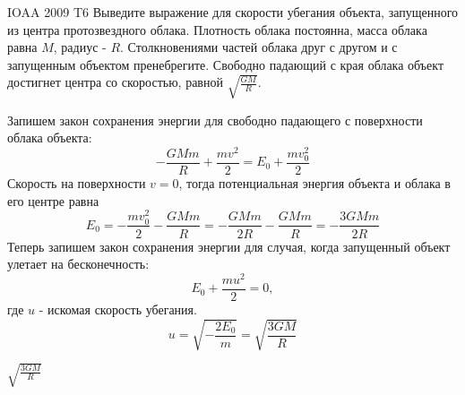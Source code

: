 \begin{problem}{IOAA 2009 T6} 
	Выведите выражение для скорости убегания объекта, запущенного из центра протозвездного облака. Плотность облака постоянна, масса облака равна $M$, радиус - $R$. Столкновениями частей облака друг с другом и с запущенным объектом пренебрегите. Свободно падающий с края облака объект достигнет центра со скоростью, равной $\sqrt{\frac{GM}{R}}$.

\begin{solution}
	Запишем закон сохранения энергии для свободно падающего с поверхности облака объекта:
    \begin{equation}
        -\frac{GMm}{R}+\frac{mv^2}{2}=E_0+\frac{mv^2_0}{2}
    \end{equation}
    Скорость на поверхности $v=0$, тогда потенциальная энергия объекта и облака в его центре равна
    \begin{equation}
        E_0=-\frac{mv^2_0}{2}-\frac{GMm}{R}=-\frac{GMm}{2R}-\frac{GMm}{R}=-\frac{3GMm}{2R}
    \end{equation}
    Теперь запишем закон сохранения энергии для случая, когда запущенный объект улетает на бесконечность:
    \begin{equation}
        E_0+\frac{mu^2}{2}=0,
    \end{equation}
    где $u$ - искомая скорость убегания.
    \begin{equation}
        u=\sqrt{-\frac{2E_0}{m}}=\sqrt{\frac{3GM}{R}}
    \end{equation}
\end{solution}

\begin{answer}
	$\sqrt{\frac{3GM}{R}}$
\end{answer}
\end{problem}